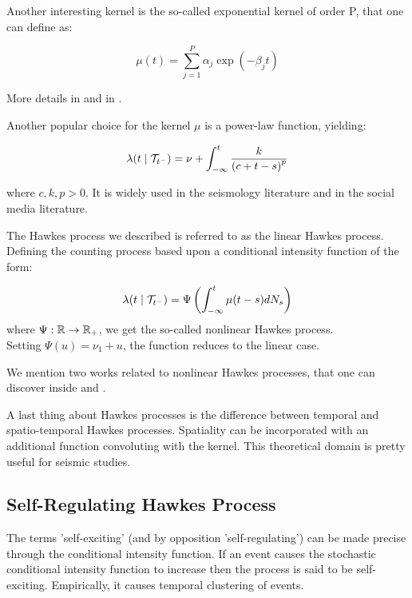 \begin{remarque}
Another interesting kernel is the so-called exponential kernel of order P, that one can define as:

$$ \mu (t) = \sum_{j=1}^P \alpha_j \exp( - \beta_j t ) $$

More details in \cite{exphawkes} and in \cite{exphawkes2}.
\end{remarque}

\begin{remarque}
Another popular choice for the kernel $\mu$ is a power-law function, yielding:

$$ \lambda (t \mid \mathcal{T}_{t^-} ) = \nu + \int_{- \infty }^t \frac{ k }{ \left ( c + t - s \right ) ^p } $$

where $c,k,p > 0$. It is widely used in the seismology literature and in the social media literature.
\end{remarque}




\begin{remarque}
The Hawkes process we described is referred to as the linear Hawkes process. Defining the counting process based upon a conditional intensity function of the form:

$$ \lambda (t \mid \mathcal{T}_{t^-}) = \Psi \left ( \int_{-\infty}^t \mu(t-s) dN_s \right ) $$ where $\Psi : \mathbb{R} \to \mathbb{R}_+$, we get the so-called nonlinear Hawkes process. \\Setting $\Psi(u) = \nu_1 + u$, the function reduces to the linear case. 

We mention two works related to nonlinear Hawkes processes, that one can discover inside \cite{nonlinearHP1} and \cite{nonlinearHP2}.
\end{remarque}

\begin{remarque}
A last thing about Hawkes processes is the difference between temporal and spatio-temporal Hawkes processes. Spatiality can be incorporated with an additional function convoluting with the kernel. This theoretical domain is pretty useful for seismic studies.
\end{remarque}



\subsection{Self-Regulating Hawkes Process}
\label{section:obral}

The terms 'self-exciting'  (and by opposition 'self-regulating') can be made precise through the conditional intensity function. If an event causes the stochastic conditional intensity function to increase then the process is said to be self-exciting. Empirically, it causes temporal clustering of events. 

